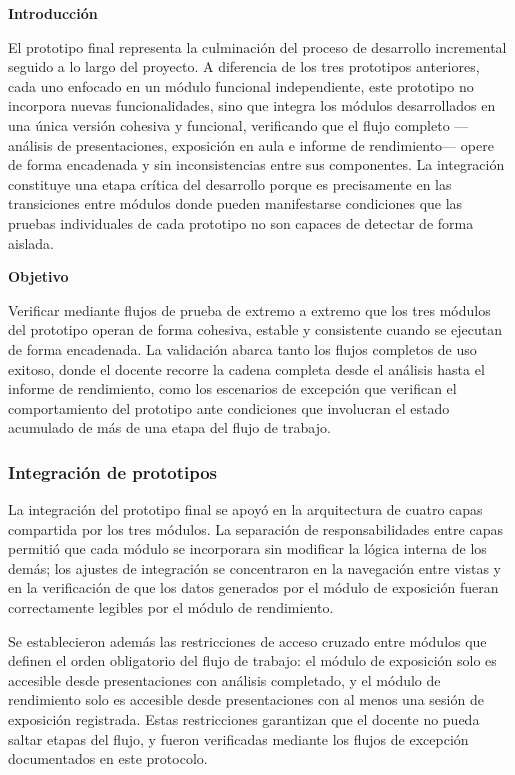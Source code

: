 \documentclass[11pt]{article}
\newif\ifshowttiimarks
\newcommand{\ttiiTOC}[1]{%
  \ifshowttiimarks
    \texorpdfstring{\textcolor{ttiipurple}{\textbf{#1}}}{#1}%
  \else
    #1%
  \fi
}
\begin{document}
\textbf{Introducción}

El prototipo final representa la culminación del proceso de desarrollo incremental seguido a lo largo del proyecto. A diferencia de los tres prototipos anteriores, cada uno enfocado en un módulo funcional independiente, este prototipo no incorpora nuevas funcionalidades, sino que integra los módulos desarrollados en una única versión cohesiva y funcional, verificando que el flujo completo —análisis de presentaciones, exposición en aula e informe de rendimiento— opere de forma encadenada y sin inconsistencias entre sus componentes. La integración constituye una etapa crítica del desarrollo porque es precisamente en las transiciones entre módulos donde pueden manifestarse condiciones que las pruebas individuales de cada prototipo no son capaces de detectar de forma aislada.

\textbf{Objetivo}

Verificar mediante flujos de prueba de extremo a extremo que los tres módulos del prototipo operan de forma cohesiva, estable y consistente cuando se ejecutan de forma encadenada. La validación abarca tanto los flujos completos de uso exitoso, donde el docente recorre la cadena completa desde el análisis hasta el informe de rendimiento, como los escenarios de excepción que verifican el comportamiento del prototipo ante condiciones que involucran el estado acumulado de más de una etapa del flujo de trabajo.

\subsubsection*{Integración de prototipos}
\addcontentsline{toc}{subsubsection}{\protect\ttiiTOC{Integración de prototipos}}

La integración del prototipo final se apoyó en la arquitectura de cuatro capas compartida por los tres módulos. La separación de responsabilidades entre capas permitió que cada módulo se incorporara sin modificar la lógica interna de los demás; los ajustes de integración se concentraron en la navegación entre vistas y en la verificación de que los datos generados por el módulo de exposición fueran correctamente legibles por el módulo de rendimiento.

Se establecieron además las restricciones de acceso cruzado entre módulos que definen el orden obligatorio del flujo de trabajo: el módulo de exposición solo es accesible desde presentaciones con análisis completado, y el módulo de rendimiento solo es accesible desde presentaciones con al menos una sesión de exposición registrada. Estas restricciones garantizan que el docente no pueda saltar etapas del flujo, y fueron verificadas mediante los flujos de excepción documentados en este protocolo.
\end{document}
